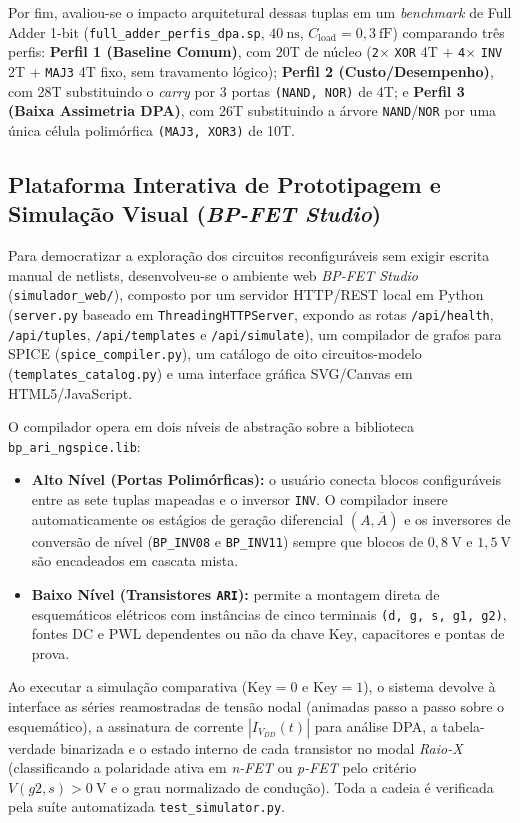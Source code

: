 Por fim, avaliou-se o impacto arquitetural dessas tuplas em um \textit{benchmark} de Full Adder 1-bit (\texttt{full\_adder\_perfis\_dpa.sp}, $40\ \text{ns}$, $C_{\mathrm{load}} = 0{,}3\ \text{fF}$) comparando tr\^{e}s perfis: \textbf{Perfil 1 (Baseline Comum)}, com 20T de n\'{u}cleo (\texttt{2}$\times$ \texttt{XOR} 4T + \texttt{4}$\times$ \texttt{INV} 2T + \texttt{MAJ3} 4T fixo, sem travamento l\'{o}gico); \textbf{Perfil 2 (Custo/Desempenho)}, com 28T substituindo o \textit{carry} por 3 portas \texttt{(NAND, NOR)} de 4T; e \textbf{Perfil 3 (Baixa Assimetria DPA)}, com 26T substituindo a \'{a}rvore \texttt{NAND}/\texttt{NOR} por uma \'{u}nica c\'{e}lula polim\'{o}rfica \texttt{(MAJ3, XOR3)} de 10T.

\subsection{Plataforma Interativa de Prototipagem e Simula\c{c}\~{a}o Visual (\textit{BP-FET Studio})}\label{sec:met_web}

Para democratizar a explora\c{c}\~{a}o dos circuitos reconfigur\'{a}veis sem exigir escrita manual de netlists, desenvolveu-se o ambiente web \textit{BP-FET Studio} (\texttt{simulador\_web/}), composto por um servidor HTTP/REST local em Python (\texttt{server.py} baseado em \texttt{ThreadingHTTPServer}, expondo as rotas \texttt{/api/health}, \texttt{/api/tuples}, \texttt{/api/templates} e \texttt{/api/simulate}), um compilador de grafos para SPICE (\texttt{spice\_compiler.py}), um cat\'{a}logo de oito circuitos-modelo (\texttt{templates\_catalog.py}) e uma interface gr\'{a}fica SVG/Canvas em HTML5/JavaScript.

O compilador opera em dois n\'{i}veis de abstra\c{c}\~{a}o sobre a biblioteca \texttt{bp\_ari\_ngspice.lib}:
\begin{itemize}
    \item \textbf{Alto N\'{i}vel (Portas Polim\'{o}rficas):} o usu\'{a}rio conecta blocos configur\'{a}veis entre as sete tuplas mapeadas e o inversor \texttt{INV}. O compilador insere automaticamente os est\'{a}gios de gera\c{c}\~{a}o diferencial $(A, \overline{A})$ e os inversores de convers\~{a}o de n\'{i}vel (\texttt{BP\_INV08} e \texttt{BP\_INV11}) sempre que blocos de $0{,}8\ \text{V}$ e $1{,}5\ \text{V}$ s\~{a}o encadeados em cascata mista.
    \item \textbf{Baixo N\'{i}vel (Transistores \texttt{ARI}):} permite a montagem direta de esquem\'{a}ticos el\'{e}tricos com inst\^{a}ncias de cinco terminais \texttt{(d, g, s, g1, g2)}, fontes DC e PWL dependentes ou n\~{a}o da chave $\text{Key}$, capacitores e pontas de prova.
\end{itemize}
Ao executar a simula\c{c}\~{a}o comparativa ($\text{Key}=0$ e $\text{Key}=1$), o sistema devolve \`{a} interface as s\'{e}ries reamostradas de tens\~{a}o nodal (animadas passo a passo sobre o esquem\'{a}tico), a assinatura de corrente $|I_{V_{DD}}(t)|$ para an\'{a}lise DPA, a tabela-verdade binarizada e o estado interno de cada transistor no modal \textit{Raio-X} (classificando a polaridade ativa em \textit{n-FET} ou \textit{p-FET} pelo crit\'{e}rio $V(g2, s) > 0\ \text{V}$ e o grau normalizado de condu\c{c}\~{a}o). Toda a cadeia \'{e} verificada pela su\'{i}te automatizada \texttt{test\_simulator.py}.
